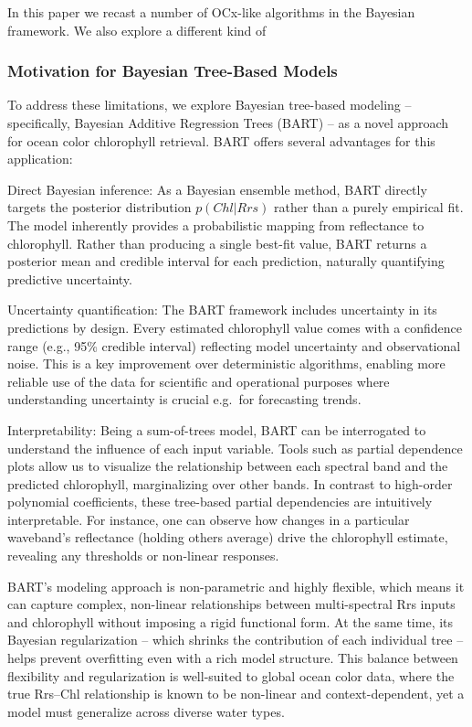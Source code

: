 \documentclass[
]{agujournal2019}
\begin{document}
In this paper we recast a number of OCx-like algorithms in the Bayesian
framework. We also explore a different kind of

\subsubsection{Motivation for Bayesian Tree-Based
Models}\label{motivation-for-bayesian-tree-based-models}

To address these limitations, we explore Bayesian tree-based modeling --
specifically, Bayesian Additive Regression Trees (BART) -- as a novel
approach for ocean color chlorophyll retrieval. BART offers several
advantages for this application:

Direct Bayesian inference: As a Bayesian ensemble method, BART directly
targets the posterior distribution \(p(Chl | Rrs)\) rather than a purely
empirical fit. The model inherently provides a probabilistic mapping
from reflectance to chlorophyll. Rather than producing a single best-fit
value, BART returns a posterior mean and credible interval for each
prediction, naturally quantifying predictive uncertainty.

Uncertainty quantification: The BART framework includes uncertainty in
its predictions by design. Every estimated chlorophyll value comes with
a confidence range (e.g., 95\% credible interval) reflecting model
uncertainty and observational noise. This is a key improvement over
deterministic algorithms, enabling more reliable use of the data for
scientific and operational purposes where understanding uncertainty is
crucial e.g.~for forecasting trends.

Interpretability: Being a sum-of-trees model, BART can be interrogated
to understand the influence of each input variable. Tools such as
partial dependence plots allow us to visualize the relationship between
each spectral band and the predicted chlorophyll, marginalizing over
other bands. In contrast to high-order polynomial coefficients, these
tree-based partial dependencies are intuitively interpretable. For
instance, one can observe how changes in a particular waveband's
reflectance (holding others average) drive the chlorophyll estimate,
revealing any thresholds or non-linear responses.

BART's modeling approach is non-parametric and highly flexible, which
means it can capture complex, non-linear relationships between
multi-spectral Rrs inputs and chlorophyll without imposing a rigid
functional form. At the same time, its Bayesian regularization -- which
shrinks the contribution of each individual tree -- helps prevent
overfitting even with a rich model structure. This balance between
flexibility and regularization is well-suited to global ocean color
data, where the true Rrs--Chl relationship is known to be non-linear and
context-dependent, yet a model must generalize across diverse water
types.
\end{document}

